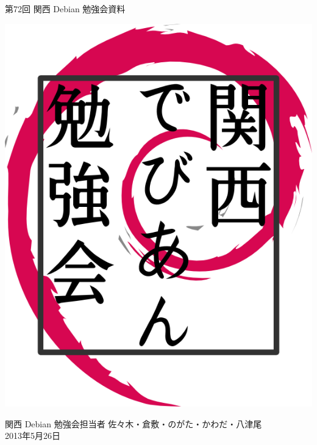 \documentclass[mingoth,a4paper]{jsarticle}
\newcommand{\debmtgyear}{2013}
\newcommand{\debmtgdate}{26}
\newcommand{\debmtgmonth}{5}
\newcommand{\debmtgnumber}{72}
\begin{document}
\begin{titlepage}


 第\debmtgnumber{}回 関西 Debian 勉強会資料

\vspace{2cm}

\begin{center}
\includegraphics{image200802/kansaidebianlogo.png}
\end{center}

\begin{flushright}
\hfill{}関西 Debian 勉強会担当者 佐々木・倉敷・のがた・かわだ・八津尾 \\
\hfill{}\debmtgyear{}年\debmtgmonth{}月\debmtgdate{}日
\end{flushright}

\thispagestyle{empty}
\end{titlepage}


\vspace{1em}
\end{document}
